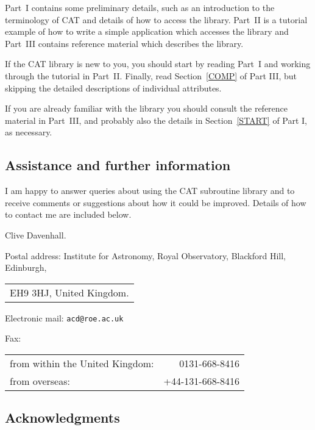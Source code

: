Part~I contains some preliminary details, such as an introduction to
the terminology of CAT and details of how to access the library. 
Part~II is a tutorial example of how to write a simple application which
accesses the library and Part~III contains reference material which
describes the library.

If the CAT library is new to you, you should start by reading Part~I 
and working through the tutorial in Part~II. Finally, read 
Section~\ref{COMP} of Part III, but skipping the detailed descriptions 
of individual attributes.

If you are already familiar with the library you should consult the
reference material in Part~III, and probably also the details in
Section~\ref{START} of Part I, as necessary.


\subsection*{Assistance and further information}

I am happy to answer queries about using the CAT subroutine library
and to receive comments or suggestions about how it could be improved. 
Details of how to contact me are included below.

\vspace{2mm}

Clive Davenhall.

\vspace{2mm}

Postal address: Institute for Astronomy, Royal Observatory, Blackford Hill,
Edinburgh, \\
\begin{tabular}{l}
EH9 3HJ, United Kingdom.  \\
\end{tabular}

Electronic mail: {\tt acd@roe.ac.uk}

Fax: \\
\begin{tabular}{lr}
from within the United Kingdom: &    0131-668-8416 \\
from overseas:                  & +44-131-668-8416 \\
\end{tabular}

\vspace*{\fill}
\stardoccopyright

\newpage
\subsection*{Acknowledgments}

